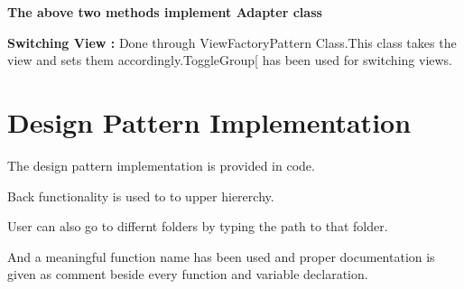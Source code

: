 \documentclass[10pt]{article}
\begin{document}
{\bfseries The above two methods implement Adapter class}


{\bfseries Switching View :} Done through ViewFactoryPattern Class.This class takes the view and sets them accordingly.ToggleGroup[ has been used for switching views.


\newpage





\section {Design Pattern Implementation}

The design pattern implementation is provided in code.

Back functionality is used to to upper hiererchy.

User can also go to differnt folders by typing the path to  that folder.

And a meaningful function name has been used and proper documentation is given as comment beside every function and variable declaration.






	
\end{document}
